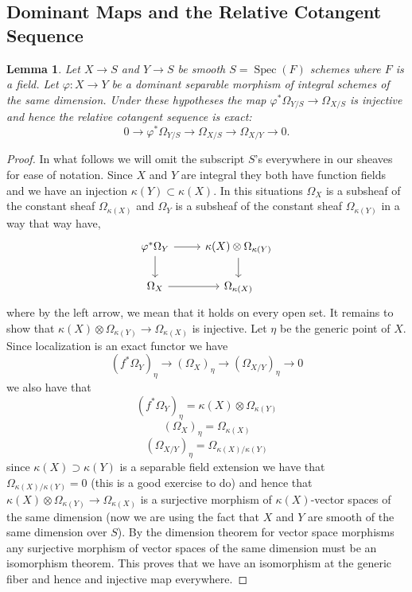 \documentclass[12pt]{article}
\numberwithin{equation}{section}
\newtheorem{lemma}[theorem]{Lemma}
\theoremstyle{definition}
\theoremstyle{remark}
\newcommand{\Spec}{\operatorname{Spec}}
\begin{document}
\subsection{Dominant Maps and the Relative Cotangent Sequence}
\begin{lemma}
	Let $X\to S$ and $Y\to S$ be smooth $S=\Spec(F)$ schemes where $F$ is a field. 
	Let $\varphi:X\to Y$ be a dominant separable morphism of integral schemes of the same dimension.
	Under these hypotheses the map $\varphi^*\Omega_{Y/S} \to \Omega_{X/S}$ is injective and hence the relative cotangent sequence is exact: 
	$$ 0 \to \varphi^*\Omega_{Y/S} \to \Omega_{X/S} \to \Omega_{X/Y} \to 0. $$
\end{lemma}
\begin{proof}
	In what follows we will omit the subscript $S$'s everywhere in our sheaves for ease of notation.
	Since $X$ and $Y$ are integral they both have function fields and we have an injection $\kappa(Y) \subset \kappa(X)$. 
	In this situations $\Omega_X$ is a subsheaf of the constant sheaf $\Omega_{\kappa(X)}$ and $\Omega_Y$ is a subsheaf of the constant sheaf $\Omega_{\kappa(Y)}$ in a way that way have,
	$$\begin{tikzcd}
	\varphi^*\Omega_Y \ar[r] \ar[d] & \kappa(X)\otimes\Omega_{\kappa(Y)} \ar[d]\\
	\Omega_X \ar[r] & \Omega_{\kappa(X)} 
	\end{tikzcd}$$
	where by the left arrow, we mean that it holds on every open set. 
	It remains to show that $\kappa(X)\otimes \Omega_{\kappa(Y)} \to \Omega_{\kappa(X)}$ is injective.
	Let $\eta$ be the generic point of $X$.
	Since localization is an exact functor we have 
	$$ (f^*\Omega_Y)_{\eta} \to (\Omega_X)_{\eta} \to (\Omega_{X/Y})_{\eta} \to 0 $$
	we also have that 
	$$ (f^*\Omega_Y)_{\eta} = \kappa(X) \otimes \Omega_{\kappa(Y)} $$ 
	$$ (\Omega_X)_{\eta} = \Omega_{\kappa(X)}$$
	$$ (\Omega_{X/Y})_{\eta} = \Omega_{\kappa(X)/\kappa(Y)} $$
	since $\kappa(X)\supset \kappa(Y)$ is a separable field extension we have that 
	$\Omega_{\kappa(X)/\kappa(Y)}=0$ (this is a good exercise to do) and hence that $\kappa(X) \otimes \Omega_{\kappa(Y)} \to \Omega_{\kappa(X)}$ is a surjective morphism of $\kappa(X)$-vector spaces of the same dimension (now we are using the fact that $X$ and $Y$ are smooth of the same dimension over $S$).
	By the dimension theorem for vector space morphisms any surjective morphism of vector spaces of the same dimension must be an isomorphism theorem.
	This proves that we have an isomorphism at the generic fiber and hence and injective map everywhere.
\end{proof}
\end{document}
